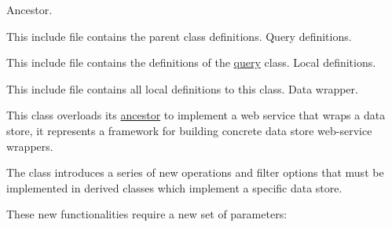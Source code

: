 Ancestor.

This include file contains the parent class definitions. Query definitions.

This include file contains the definitions of the \hyperlink{class_c_query}{query} class. Local definitions.

This include file contains all local definitions to this class. Data wrapper.

This class overloads its \hyperlink{class_c_wrapper}{ancestor} to implement a web service that wraps a data store, it represents a framework for building concrete data store web-\/service wrappers.

The class introduces a series of new operations and filter options that must be implemented in derived classes which implement a specific data store.

These new functionalities require a new set of parameters\-:


